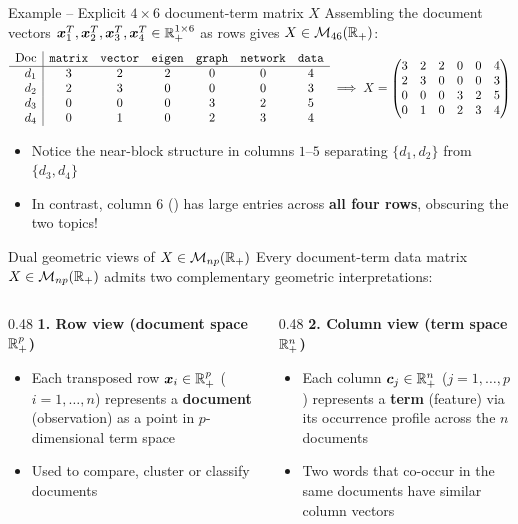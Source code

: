 \documentclass[aspectratio=169]{beamer}\usepackage[]{graphicx}\usepackage[]{xcolor}
\begin{document}
\begin{frame}{Example -- Explicit $4 \times 6$ document-term matrix $X$}
Assembling the document vectors $\bm{x}_1^T, \bm{x}_2^T, \bm{x}_3^T, \bm{x}_4^T \in \mathbb{R}_+^{1 \times 6}$ as rows gives $X \in \mathcal{M}_{46}(\mathbb{R}_+)$:
\[
\begin{array}{r|cccccc}
\textrm{Doc} & {\tt matrix} & {\tt vector} & {\tt eigen} & {\tt graph} & {\tt network} & {\tt data} \\
\hline
d_1 & 3 & 2 & 2 & 0 & 0 & 4 \\
d_2 & 2 & 3 & 0 & 0 & 0 & 3 \\
d_3 & 0 & 0 & 0 & 3 & 2 & 5 \\
d_4 & 0 & 1 & 0 & 2 & 3 & 4
\end{array}
\implies
X = \begin{pmatrix}
3 & 2 & 2 & 0 & 0 & 4 \\
2 & 3 & 0 & 0 & 0 & 3 \\
0 & 0 & 0 & 3 & 2 & 5 \\
0 & 1 & 0 & 2 & 3 & 4
\end{pmatrix}
\]
\vfill
\begin{itemize}
\item Notice the near-block structure in columns $1$--$5$ separating $\{d_1, d_2\}$ from $\{d_3, d_4\}$
\item In contrast, column $6$ () has large entries across \textbf{all four rows}, obscuring the two topics!
\end{itemize}
\end{frame}


\begin{frame}{Dual geometric views of $X \in \mathcal{M}_{np}(\mathbb{R}_+)$}
Every document-term data matrix $X \in \mathcal{M}_{np}(\mathbb{R}_+)$ admits two complementary geometric interpretations:
\vfill
\begin{columns}[t]
\begin{column}{0.48\textwidth}
\textbf{1. Row view (document space $\mathbb{R}_+^p$)}
\begin{itemize}
\item Each transposed row $\bm{x}_i \in \mathbb{R}_+^p$ ($i=1,\ldots,n$) represents a \textbf{document} (observation) as a point in $p$-dimensional term space
\item Used to compare, cluster or classify documents
\end{itemize}
\end{column}
\begin{column}{0.48\textwidth}
\textbf{2. Column view (term space $\mathbb{R}_+^n$)}
\begin{itemize}
\item Each column $\bm{c}_j \in \mathbb{R}_+^n$ ($j=1,\ldots,p$) represents a \textbf{term} (feature) via its occurrence profile across the $n$ documents
\item Two words that co-occur in the same documents have similar column vectors
\end{itemize}
\end{column}
\end{columns}
\end{frame}
\end{document}
